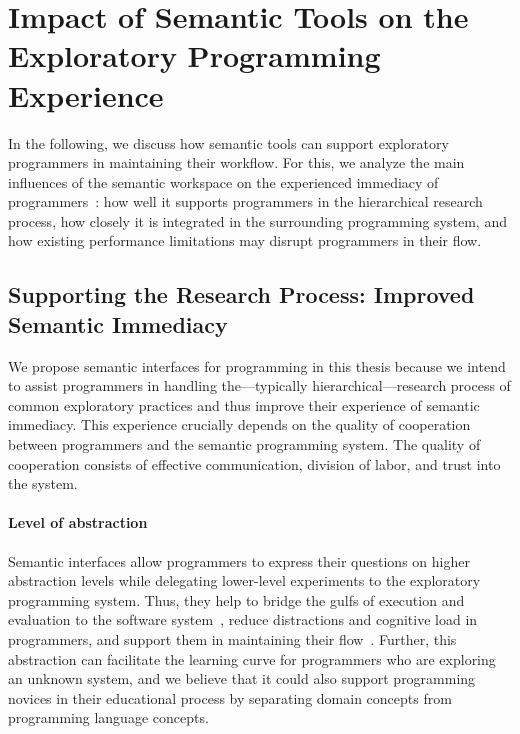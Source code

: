 
\section{Impact of Semantic Tools on the Exploratory Programming Experience}
\label{sec:discussion/experience}

In the following, we discuss how semantic tools can support exploratory programmers in maintaining their workflow.
For this, we analyze the main influences of the semantic workspace on the experienced immediacy of programmers~\cite{ungar1997debugging}: how well it supports programmers in the hierarchical research process, how closely it is integrated in the surrounding programming system, and how existing performance limitations may disrupt programmers in their flow.

\subsection{Supporting the Research Process: Improved Semantic Immediacy}
\label{sec:discussion/experience/process}

We propose semantic interfaces for programming in this thesis because we intend to assist programmers in handling the---typically hierarchical---research process of common exploratory practices and thus improve their experience of semantic immediacy.
This experience crucially depends on the quality of cooperation between programmers and the semantic programming system.
The quality of cooperation consists of effective communication, division of labor, and trust into the system.

\paragraph{Level of abstraction}
\label{par:discussion/experience/process/abstraction}

Semantic interfaces allow programmers to express their questions on higher abstraction levels while delegating lower-level experiments to the exploratory programming system.
Thus, they help to bridge the gulfs of execution and evaluation to the software system~\cite{norman1986cognitive}, reduce distractions and cognitive load in programmers, and support them in maintaining their flow~\cite{csikszentmihalyi2008flow}.
Further, this abstraction can facilitate the learning curve for programmers who are exploring an unknown system, and we believe that it could also support programming novices in their educational process by separating domain concepts from programming language concepts.

